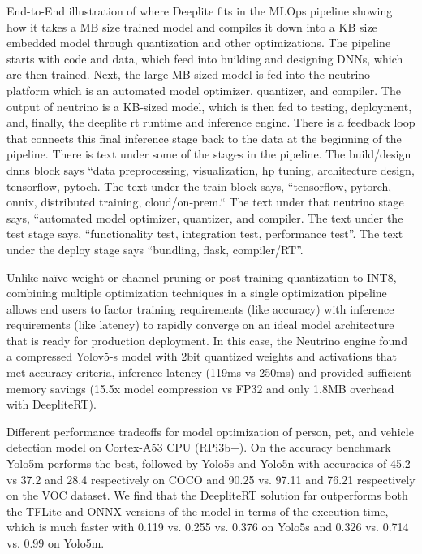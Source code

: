 {{{{{    End-to-End illustration of where Deeplite fits in the MLOps pipeline showing how it takes a MB size trained model and compiles it down into a KB size embedded model through quantization and other optimizations. The pipeline starts with code and data, which feed into building and designing DNNs, which are then trained. Next, the large MB sized model is fed into the neutrino platform which is an automated model optimizer, quantizer, and compiler. The output of neutrino is a KB-sized model, which is then fed to testing, deployment, and, finally, the deeplite rt runtime and inference engine. There is a feedback loop that connects this final inference stage back to the data at the beginning of the pipeline. There is text under some of the stages in the pipeline. The build/design dnns block says “data preprocessing, visualization, hp tuning, architecture design, tensorflow, pytoch. The text under the train block says, “tensorflow, pytorch, onnix, distributed training, cloud/on-prem.“ The text under that neutrino stage says, “automated model optimizer, quantizer, and compiler. The text under the test stage says, “functionality test, integration test, performance test”. The text under the deploy stage says “bundling, flask, compiler/RT”.
    
    Unlike naïve weight or channel pruning or post-training quantization to INT8, combining multiple optimization techniques in a single optimization pipeline allows end users to factor training requirements (like accuracy) with inference requirements (like latency) to rapidly converge on an ideal model architecture that is ready for production deployment. In this case, the Neutrino engine found a compressed Yolov5-s model with 2bit quantized weights and activations that met accuracy criteria, inference latency (119ms vs 250ms) and provided sufficient memory savings (15.5x model compression vs FP32 and only 1.8MB overhead with DeepliteRT).
    
    
    Different performance tradeoffs for model optimization of person, pet, and vehicle detection model on Cortex-A53 CPU (RPi3b+). On the accuracy benchmark Yolo5m performs the best, followed by Yolo5s and Yolo5n with accuracies of 45.2 vs 37.2 and 28.4 respectively on COCO and 90.25 vs. 97.11 and 76.21 respectively on the VOC dataset. We find that the DeepliteRT solution far outperforms both the TFLite and ONNX versions of the model in terms of the execution time, which is much faster with 0.119 vs. 0.255 vs. 0.376 on Yolo5s and 0.326 vs. 0.714 vs. 0.99 on Yolo5m.
    
}}}}}
